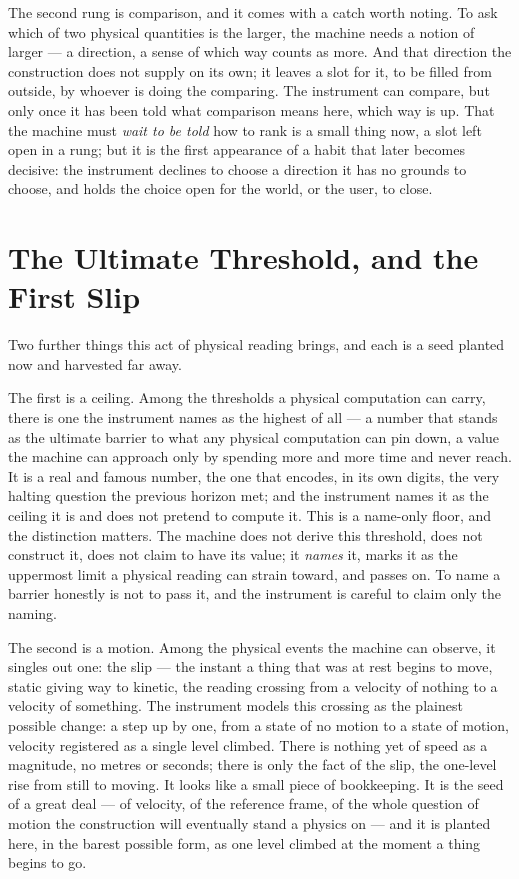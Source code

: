 The second rung is comparison, and it comes with a catch worth noting. To ask which of two physical quantities is
the larger, the machine needs a notion of larger --- a direction, a sense of which way counts as more. And that
direction the construction does not supply on its own; it leaves a slot for it, to be filled from outside, by
whoever is doing the comparing. The instrument can compare, but only once it has been told what comparison means
here, which way is up. That the machine must \emph{wait to be told} how to rank is a small thing now, a slot left
open in a rung; but it is the first appearance of a habit that later becomes decisive: the instrument declines to
choose a direction it has no grounds to choose, and holds the choice open for the world, or the user, to close.

\section{The Ultimate Threshold, and the First Slip}

Two further things this act of physical reading brings, and each is a seed planted now and harvested far away.

The first is a ceiling. Among the thresholds a physical computation can carry, there is one the instrument names
as the highest of all --- a number that stands as the ultimate barrier to what any physical computation can pin
down, a value the machine can approach only by spending more and more time and never reach. It is a real and
famous number, the one that encodes, in its own digits, the very halting question the previous horizon met; and the
instrument names it as the ceiling it is and does not pretend to compute it. This is a name-only floor, and the
distinction matters. The machine does not derive this threshold, does not construct it, does not claim to have
its value; it \emph{names} it, marks it as the uppermost limit a physical reading can strain toward, and passes
on. To name a barrier honestly is not to pass it, and the instrument is careful to claim only the naming.

The second is a motion. Among the physical events the machine can observe, it singles out one: the slip --- the
instant a thing that was at rest begins to move, static giving way to kinetic, the reading crossing from a
velocity of nothing to a velocity of something. The instrument models this crossing as the plainest possible
change: a step up by one, from a state of no motion to a state of motion, velocity registered as a single level
climbed. There is nothing yet of speed as a magnitude, no metres or seconds; there is only the fact of the slip,
the one-level rise from still to moving. It looks like a small piece of bookkeeping. It is the seed of a great
deal --- of velocity, of the reference frame, of the whole question of motion the construction will eventually
stand a physics on --- and it is planted here, in the barest possible form, as one level climbed at the moment a
thing begins to go.

